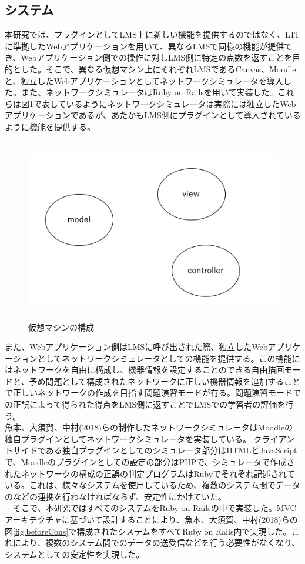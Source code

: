 \subsection{システム}
\label{tag:function}
本研究では、プラグインとしてLMS上に新しい機能を提供するのではなく、LTIに準拠したWebアプリケーションを用いて、異なるLMSで同様の機能が提供でき、Webアプリケーション側での操作に対しLMS側に特定の点数を返すことを目的とした。そこで、異なる仮想マシン上にそれぞれLMSであるCanvas、Moodleと、独立したWebアプリケーションとしてネットワークシミュレータを導入した。また、ネットワークシミュレータはRuby on Railsを用いて実装した。これらは図\ref{fig:virtualMachine}で表しているようにネットワークシミュレータは実際には独立したWebアプリケーションであるが、あたかもLMS側にプラグインとして導入されているように機能を提供する。

\begin{figure}[htbp]
  \begin{center}
    \includegraphics[clip,width=12.0cm,height=8.0cm]{img/virtualMachine.png}
    \caption{仮想マシンの構成}
    \label{fig:virtualMachine}
  \end{center}
\end{figure}



また、Webアプリケーション側はLMSに呼び出された際、独立したWebアプリケーションとしてネットワークシミュレータとしての機能を提供する。この機能にはネットワークを自由に構成し、機器情報を設定することのできる自由描画モードと、予め問題として構成されたネットワークに正しい機器情報を追加することで正しいネットワークの作成を目指す問題演習モードが有る。問題演習モードでの正誤によって得られた得点をLMS側に返すことでLMSでの学習者の評価を行う。\\
魚本、大須賀、中村(2018)らの制作したネットワークシミュレータはMoodleの独自プラグインとしてネットワークシミュレータを実装している。
クライアントサイドである独自プラグインとしてのシミュレータ部分はHTMLとJavaScriptで、Moodleのプラグインとしての設定の部分はPHPで、シミュレータで作成されたネットワークの構成の正誤の判定プログラムはRubyでそれぞれ記述されている。これは、様々なシステムを使用しているため、複数のシステム間でデータのなどの連携を行わなければならず、安定性にかけていた。\\
　そこで、本研究ではすべてのシステムをRuby on Railsの中で実装した。MVCアーキテクチャに基づいて設計することにより、魚本、大須賀、中村(2018)らの図\ref{fig:beforeCons}で構成されたシステムをすべてRuby on Rails内で実現した。これにより、複数のシステム間でのデータの送受信などを行う必要性がなくなり、システムとしての安定性を実現した。
